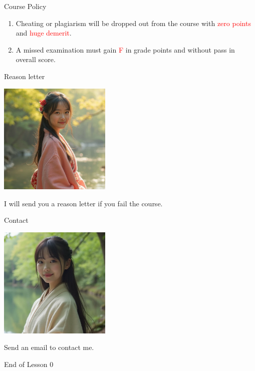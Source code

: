 \documentclass{beamer}
\begin{document}
\begin{frame}{Course Policy}
\begin{enumerate}
\item Cheating or plagiarism will be dropped out from the course with \textcolor{red}{zero points} and \textcolor{red}{huge demerit}. \\
\item A missed examination must gain \textcolor{red}{F} in grade points and without pass in overall score. 
\end{enumerate}
\end{frame}
\begin{frame}{Reason letter}
\begin{center}
\includegraphics[width=0.4\textwidth]{endeavor.png}
\end{center}
\begin{center}
I will send you a reason letter if you fail the course.
\end{center}
\end{frame}
\begin{frame}{Contact}
\begin{center}
\includegraphics[width=0.4\textwidth]{kg.png}
\end{center}
\begin{center}
Send an email to contact me.
\end{center}
\end{frame}
\begin{frame}{}
\begin{center}
\Large{End of Lesson 0}
\end{center}
\end{frame}
\end{document}
